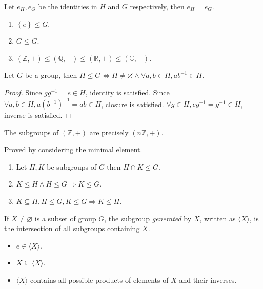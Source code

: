 \documentclass[10pt]{article}
\def\le{\leqslant}
\begin{document}
    \begin{proposition}\label{prop:uniqueness of identity}
        Let $ e_H, e_G $ be the identities in $H$ and $G$ respectively, then $e_H=e_G$. 
    \end{proposition}
    \begin{example}
        \begin{enumerate}[(1)]
            \item $ \left\{ e\right\} \le G $.
            \item $ G\le G $.
            \item $ (\mathbb{Z} ,+)\le (\mathbb{Q} ,+)\le (\mathbb{R} ,+)\le (\mathbb{C} ,+) $.
        \end{enumerate}
    \end{example}
    \begin{lemma}\label{lma:subgroup test}
        Let $ G $ be a group, then $ H\le G \Leftrightarrow H\neq \varnothing \land \forall a,b\in H, ab^{-1}\in H $.
    \end{lemma}
    \begin{proof}
        Since $gg^{-1}=e\in H$, identity is satisfied. Since $ \forall a,b\in H, a(b^{-1})^{-1}=ab\in H $, closure is satisfied. $ \forall g\in H, eg^{-1}=g^{-1}\in H $, inverse is satisfied.
    \end{proof}
    \begin{proposition}\label{prop:subgroups of integers}
        The subgroups of $ (\mathbb{Z} ,+) $ are precisely $ (n \mathbb{Z} ,+) $.
    \end{proposition}
    Proved by considering the minimal element.
    \begin{proposition}\label{prop:comparing_groups}
        \begin{enumerate}[(1)]
            \item Let $ H,K $ be subgroups of $G$ then $ H\cap K\le G $.
            \item $ K\le H \land H\le G \Rightarrow K\le G $.
            \item $ K \subseteq H, H\le G, K\le G \Rightarrow K\le H $.
        \end{enumerate}
    \end{proposition}
    \begin{definition}
        If $ X\neq \varnothing $ is a subset of group $G$, the subgroup \textit{generated} by $X$, written as $ \langle X \rangle $, is the intersection of all subgroups containing $X$.
    \end{definition}
    \begin{remark}
        \begin{itemize}
            \item $ e\in \langle X \rangle $.
            \item $ X \subseteq \langle X \rangle $.
            \item $ \langle X \rangle $ contains all possible products of elements of $X$ and their inverses.
        \end{itemize}
    \end{remark}
\end{document}
